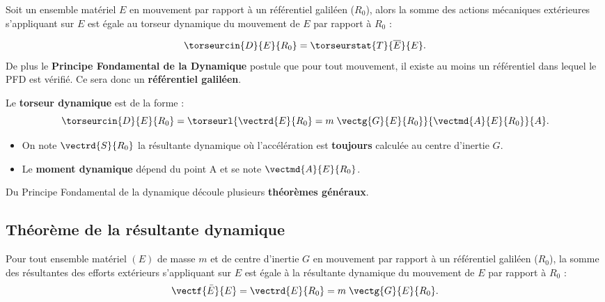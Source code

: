 \begin{definition}
Soit un ensemble matériel $E$ en mouvement par rapport à un référentiel galiléen ($R_0$), alors la somme des actions mécaniques extérieures s'appliquant sur $E$ est égale au torseur dynamique du mouvement de $E$ par rapport à $R_0$ :

$$
\torseurcin{D}{E}{R_0}=\torseurstat{T}{\overline{E}}{E}.
$$
De plus le \textbf{Principe Fondamental de la Dynamique} postule que pour tout mouvement, il existe au moins un référentiel dans lequel le PFD est vérifié. Ce sera donc un \textbf{référentiel galiléen}.


\begin{minipage}[c]{.48\linewidth}
Le \textbf{torseur dynamique} est de la forme : 
$$
\torseurcin{D}{E}{R_0}=\torseurl{
\vectrd{E}{R_0}=m\;\vectg{G}{E}{R_0}
}{
\vectmd{A}{E}{R_0}
}{A}.
$$

\end{minipage} \hfill
\begin{minipage}[c]{.48\linewidth}
\begin{itemize}
\item On note $\vectrd{S}{R_0}$ la résultante dynamique où l'accélération est \textbf{toujours} calculée au centre d'inertie $G$.
\item Le \textbf{moment dynamique} dépend du point A et se note $\vectmd{A}{E}{R_0}$.
\end{itemize}

\end{minipage} 

%



\end{definition}


Du Principe Fondamental de la dynamique découle plusieurs \textbf{théorèmes généraux}.
\subsection{Théorème de la résultante dynamique}

		\begin{theorem}
			Pour tout ensemble matériel $(E)$ de masse $m$ et de centre d'inertie $G$ en mouvement par rapport à un référentiel galiléen ($R_0$), la somme des résultantes des efforts extérieurs s'appliquant sur $E$ est égale à la résultante dynamique du mouvement de $E$ par rapport à $R_0$ :
$$
\vectf{\bar E}{E}=\vectrd{E}{R_0}=m\;\vectg{G}{E}{R_0}.
$$
	\end{theorem}


